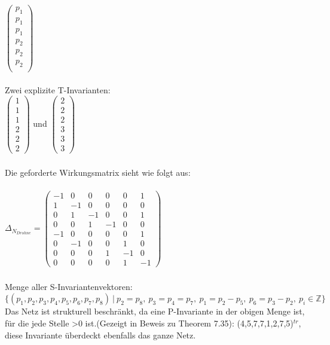 \documentclass[a4paper,12pt]{scrartcl}
\begin{document}
$
\begin{pmatrix}
p_1\\
p_1\\
p_1\\
p_2\\
p_2\\
p_2\\
\end{pmatrix}
$\\\\
Zwei explizite T-Invarianten:\\
$
\begin{pmatrix}
1\\
1\\
1\\
2\\
2\\
2
\end{pmatrix}
$
und
$
\begin{pmatrix}
2\\
2\\
2\\
3\\
3\\
3
\end{pmatrix}
$
\subsubsection{}
Die geforderte Wirkungsmatrix sieht wie folgt aus:\\\\
$
\Delta_{N_{Drohne}} = 
\begin{pmatrix}
-1 & 0 & 0 & 0 & 0 & 1\\
1 & -1 & 0 & 0 & 0 & 0\\
0 & 1 & -1 & 0 & 0 & 1\\
0 & 0 & 1 & -1 & 0 & 0\\
-1 & 0 & 0 & 0 & 0 & 1\\
0 & -1 & 0 & 0 & 1 & 0\\
0 & 0 & 0 & 1 & -1 & 0\\
0 & 0 & 0 & 0 & 1 & -1
\end{pmatrix}
$
\subsubsection{}
Menge aller S-Invariantenvektoren:\\
$\{(p_1,p_2,p_3,p_4,p_5,p_6,p_7,p_8)\ |\ p_2=p_8,\ p_3=p_4=p_7,\ p_1=p_2-p_5,\ p_6=p_3-p_2,\ p_i \in \mathbb{Z}\}$
Das Netz ist strukturell beschränkt, da eine P-Invariante in der obigen Menge ist, für die jede Stelle >0 ist.(Gezeigt in Beweis zu Theorem 7.35): (4,5,7,7,1,2,7,5)$^{tr}$, diese Invariante überdeckt ebenfalls das ganze Netz.
\end{document}
